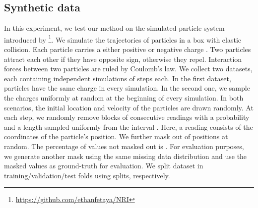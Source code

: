 \documentclass{article} \usepackage{iclr2022_conference,times}
\begin{document}
\subsection{Synthetic data}
\label{a:synthetic}
In this experiment, we test our method on the simulated particle system introduced by \citet{kipf2018neural}\footnote{\url{https://github.com/ethanfetaya/NRI}}. We simulate the trajectories of  particles in a  box with elastic collision. Each particle carries a either positive or negative charge . Two particles attract each other if they have opposite sign, otherwise they repel. Interaction forces between two particles are ruled by Coulomb's law. We collect two datasets, each containing  independent simulations of  steps each. In the first dataset, particles have the same charge in every simulation. In the second one, we sample the charges uniformly at random at the beginning of every simulation. In both scenarios, the initial location and velocity of the particles are drawn randomly.
At each step,  we randomly remove blocks of consecutive readings with a probability  and a length sampled uniformly from the interval . Here, a reading consists of the  coordinates of the particle's position. We further mask out  of positions at random. The percentage of values not masked out is .
For evaluation purposes, we generate another mask using the same missing data distribution and use the masked values as ground-truth for evaluation. We split dataset in training/validation/test folds using  splits, respectively.
\end{document}
